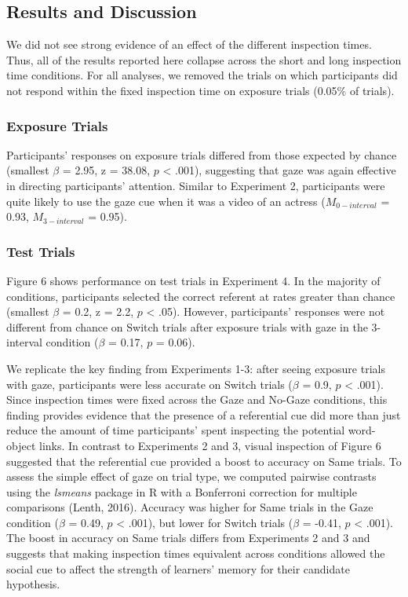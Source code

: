 \documentclass[authoryear, review]{elsarticle}
\begin{document}
\subsection{Results and Discussion}\label{results-and-discussion-3}

We did not see strong evidence of an effect of the different inspection
times. Thus, all of the results reported here collapse across the short
and long inspection time conditions. For all analyses, we removed the
trials on which participants did not respond within the fixed inspection
time on exposure trials (0.05\% of trials).

\subsubsection{Exposure Trials}\label{exposure-trials-3}

Participants' responses on exposure trials differed from those expected
by chance (smallest \(\beta\) = 2.95, z = 38.08, \(p\) \textless{}
.001), suggesting that gaze was again effective in directing
participants' attention. Similar to Experiment 2, participants were
quite likely to use the gaze cue when it was a video of an actress
(\(M_{0-interval}\) = 0.93, \(M_{3-interval}\) = 0.95).

\subsubsection{Test Trials}\label{test-trials-3}

Figure 6 shows performance on test trials in Experiment 4. In the
majority of conditions, participants selected the correct referent at
rates greater than chance (smallest \(\beta\) = 0.2, z = 2.2, \(p\)
\textless{} .05). However, participants' responses were not different
from chance on Switch trials after exposure trials with gaze in the
3-interval condition (\(\beta\) = 0.17, \(p\) = 0.06).

We replicate the key finding from Experiments 1-3: after seeing exposure
trials with gaze, participants were less accurate on Switch trials
(\(\beta\) = 0.9, \(p\) \textless{} .001). Since inspection times were
fixed across the Gaze and No-Gaze conditions, this finding provides
evidence that the presence of a referential cue did more than just
reduce the amount of time participants' spent inspecting the potential
word-object links. In contrast to Experiments 2 and 3, visual inspection
of Figure 6 suggested that the referential cue provided a boost to
accuracy on Same trials. To assess the simple effect of gaze on trial
type, we computed pairwise contrasts using the \emph{lsmeans} package in
R with a Bonferroni correction for multiple comparisons (Lenth, 2016).
Accuracy was higher for Same trials in the Gaze condition (\(\beta\) =
0.49, \(p\) \textless{} .001), but lower for Switch trials (\(\beta\) =
-0.41, \(p\) \textless{} .001). The boost in accuracy on Same trials
differs from Experiments 2 and 3 and suggests that making inspection
times equivalent across conditions allowed the social cue to affect the
strength of learners' memory for their candidate hypothesis.
\end{document}
